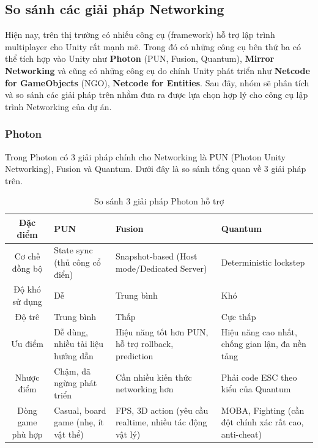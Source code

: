 \subsection{So sánh các giải pháp Networking}
Hiện nay, trên thị trường có nhiếu công cụ (framework) hỗ trợ lập trình multiplayer cho Unity rất mạnh mẽ. Trong đó có những công cụ bên thứ ba có thể tích hợp vào Unity như \textbf{Photon} (PUN, Fusion, Quantum), \textbf{Mirror Networking} và cũng có những công cụ do chính Unity phát triển như \textbf{Netcode for GameObjects} (NGO), \textbf{Netcode for Entities}. Sau đây, nhóm sẽ phân tích và so sánh các giải pháp trên nhằm đưa ra được lựa chọn hợp lý cho công cụ lập trình Networking của dự án.
\subsubsection{Photon}
    Trong Photon có 3 giải pháp chính cho Networking là PUN (Photon Unity Networking), Fusion và Quantum. Dưới đây là so sánh tổng quan về 3 giải pháp trên.

    \begin{table}[H]
        \centering
        \begin{tabular}{|c|M{3cm}|M{3.5cm}|M{3cm}|} 
            \hline
                \textbf{Đặc điểm} & \textbf{PUN} & \textbf{Fusion} & \textbf{Quantum} \\
                \hline
                Cơ chế đồng bộ & State sync (thủ công cổ điển) & Snapshot-based (Host mode/Dedicated Server) & Deterministic lockstep\\
                \hline
                Độ khó sử dụng & Dễ & Trung bình & Khó \\
                \hline
                Độ trê & Trung bình & Thấp & Cực thấp \\
                \hline
                Ưu điểm & Dễ dùng, nhiều tài liệu hướng dẫn & Hiệu năng tốt hơn PUN, hỗ trợ rollback, prediction & Hiệu năng cao nhất, chống gian lận, đa nền tảng \\
                \hline
                Nhược điểm & Chậm, đã ngừng phát triển & Cần nhiều kiến thức networking hơn & Phải code ESC theo kiểu của Quantum\\
                \hline
                Dòng game phù hợp & Casual, board game (nhẹ, ít vật thể) & FPS, 3D action (yêu cầu realtime, nhiều tác động vật lý) & MOBA, Fighting (cần đột chính xác rất cao, anti-cheat)\\
                \hline
        \end{tabular}
        \caption{So sánh 3 giải pháp Photon hỗ trợ}
        \label{tab:photon}
    \end{table}

